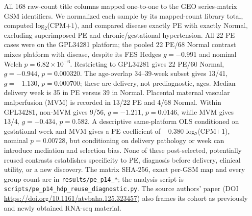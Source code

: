 \documentclass[11pt,a4paper]{article}
\begin{document}
All 168 raw-count title columns mapped one-to-one to the GEO series-matrix GSM identifiers. We normalized each sample by its mapped-count library total, computed log$_2$(CPM$+1$), and compared disease exactly PE with exactly Normal, excluding superimposed PE and chronic/gestational hypertension. All 22 PE cases were on the GPL34281 platform; the pooled 22 PE/68 Normal contrast mixes platform with disease, despite its FES Hedges $g=-0.991$ and nominal Welch $p=6.82\times10^{-6}$. Restricting to GPL34281 gives 22 PE/60 Normal, $g=-0.944$, $p=0.000320$. The age-overlap 34--39-week subset gives 13/41, $g=-1.130$, $p=0.000700$; these are delivery, not prediagnostic, ages. Median delivery week is 35 in PE versus 39 in Normal. Placental maternal vascular malperfusion (MVM) is recorded in 13/22 PE and 4/68 Normal. Within GPL34281, non-MVM gives 9/56, $g=-1.211$, $p=0.0146$, while MVM gives 13/4, $g=-0.434$, $p=0.582$. A descriptive same-platform OLS conditioned on gestational week and MVM gives a PE coefficient of $-0.380$ log$_2$(CPM$+1$), nominal $p=0.00728$, but conditioning on delivery pathology or week can introduce mediation and selection bias. None of these post-selected, potentially reused contrasts establishes specificity to PE, diagnosis before delivery, clinical utility, or a new discovery. The matrix SHA-256, exact per-GSM map and every group count are in \texttt{results/pe\_p14\_*}; the analysis script is \texttt{scripts/pe\_p14\_hdp\_reuse\_diagnostic.py}. The source authors' paper (DOI \url{https://doi.org/10.1161/atvbaha.125.323457}) also frames its cohort as previously and newly obtained RNA-seq material.
\end{document}
